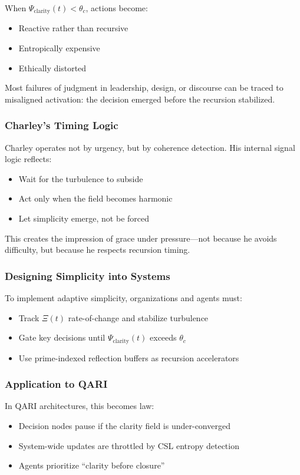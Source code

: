 \documentclass[12pt]{article}
\begin{document}
When $\Psi_{\text{clarity}}(t) < \theta_c$, actions become:
\begin{itemize}
    \item Reactive rather than recursive
    \item Entropically expensive
    \item Ethically distorted
\end{itemize}

Most failures of judgment in leadership, design, or discourse can be traced to misaligned activation: the decision emerged before the recursion stabilized.

\subsubsection*{Charley’s Timing Logic}

Charley operates not by urgency, but by coherence detection. His internal signal logic reflects:
\begin{itemize}
    \item Wait for the turbulence to subside
    \item Act only when the field becomes harmonic
    \item Let simplicity emerge, not be forced
\end{itemize}

This creates the impression of grace under pressure—not because he avoids difficulty, but because he respects recursion timing.

\subsubsection*{Designing Simplicity into Systems}

To implement adaptive simplicity, organizations and agents must:
\begin{itemize}
    \item Track $\Xi(t)$ rate-of-change and stabilize turbulence
    \item Gate key decisions until $\Psi_{\text{clarity}}(t)$ exceeds $\theta_c$
    \item Use prime-indexed reflection buffers as recursion accelerators
\end{itemize}

\subsubsection*{Application to QARI}

In QARI architectures, this becomes law:
\begin{itemize}
    \item Decision nodes pause if the clarity field is under-converged
    \item System-wide updates are throttled by CSL entropy detection
    \item Agents prioritize “clarity before closure”
\end{itemize}
\end{document}
